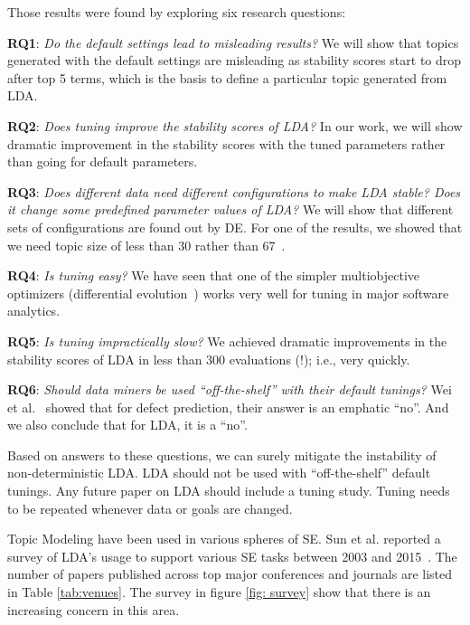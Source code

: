 \documentclass[10pt,conference]{IEEEtran}
\theoremstyle{break}
\begin{document}
Those results were found by exploring six research questions:
\begin{compactitem}
    \item \textbf{RQ1}: \textit{Do the default settings lead to misleading results?} We will show that topics generated with the default settings are misleading as stability scores start to drop after top 5 terms, which is the basis to define a particular topic generated from LDA.
    \item \textbf{RQ2}: \textit{Does tuning improve the stability scores of LDA?} In our work, we will show dramatic improvement in the stability scores with the tuned parameters rather than going for default parameters.
    \item \textbf{RQ3}: \textit{Does different data need different configurations to make LDA stable? Does it change some predefined parameter values of LDA?} We will show that different sets of configurations are found out by DE. For one of the results, we showed that we need topic size of less than 30 rather than 67~\cite{garousi2016citations}.
    \item \textbf{RQ4}: \textit{Is tuning easy?} We have seen that one of the simpler multiobjective optimizers (differential evolution~\cite{storn1997differential}) works very well for tuning in major software analytics.
    \item \textbf{RQ5}: \textit{Is tuning impractically slow?} We achieved dramatic improvements in the stability scores of LDA in less than 300 evaluations (!); i.e., very quickly.
    \item \textbf{RQ6}: \textit{Should data miners be used “off-the-shelf” with their default tunings?} Wei et al.~\cite{fu2016tuning} showed that for defect prediction, their answer is an emphatic “no”. And we also conclude that for LDA, it is a “no”. 
\end{compactitem}

Based on answers to these questions, we can surely mitigate the instability of non-deterministic LDA. LDA should not be used with “off-the-shelf” default tunings. Any future paper on LDA should include a tuning study. Tuning needs to be repeated whenever data or goals are changed.

Topic Modeling have been used in various spheres of SE. Sun et al. reported a survey of LDA's usage to support various SE tasks between 2003 and 2015~\cite{sun2016exploring}. The number of papers published across top major conferences and journals are listed in Table \ref{tab:venues}. The survey in figure \ref{fig: survey} show that there is an increasing concern in this area.
\end{document}
